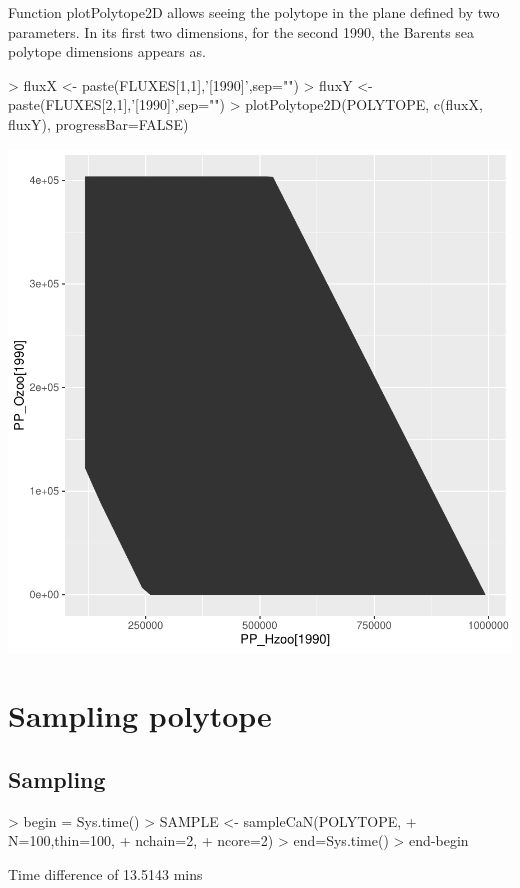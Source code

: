 \documentclass{article}
\begin{document}
Function plotPolytope2D allows seeing the polytope in the plane defined by two parameters. In its first two dimensions, for the second 1990, the Barents sea polytope dimensions appears as. 

\begin{Schunk}
\begin{Sinput}
> fluxX <- paste(FLUXES[1,1],'[1990]',sep="")
> fluxY <- paste(FLUXES[2,1],'[1990]',sep="")
> plotPolytope2D(POLYTOPE, c(fluxX, fluxY), progressBar=FALSE)
\end{Sinput}
\end{Schunk}
\includegraphics{barents_SM-011}

\clearpage

\section{Sampling polytope}

\subsection{Sampling}

\begin{Schunk}
\begin{Sinput}
> begin = Sys.time()
> SAMPLE <- sampleCaN(POLYTOPE, 
+                       N=100,thin=100, 
+                       nchain=2,
+                       ncore=2)
> end=Sys.time()
> end-begin
\end{Sinput}
\begin{Soutput}
Time difference of 13.5143 mins
\end{Soutput}
\end{Schunk}
\end{document}
